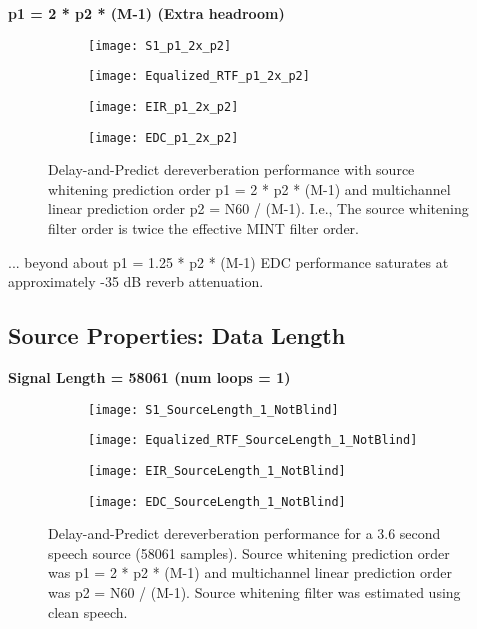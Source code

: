 \textbf{p1 = 2 * p2  * (M-1) (Extra headroom)}

\begin{figure}[H]
	\centering
	\begin{subfigure}[b]{0.49\textwidth}
		\centering
		\texttt{[image: S1\_p1\_2x\_p2]}
	\end{subfigure}
	\hfill
	\begin{subfigure}[b]{0.49\textwidth}
		\centering
		\texttt{[image: Equalized\_RTF\_p1\_2x\_p2]}
	\end{subfigure}
	\hfill
	\begin{subfigure}[b]{0.49\textwidth}
		\centering
		\texttt{[image: EIR\_p1\_2x\_p2]}
	\end{subfigure}
	\hfill
	\begin{subfigure}[b]{0.49\textwidth}
		\centering
		\texttt{[image: EDC\_p1\_2x\_p2]}
	\end{subfigure}
	\hfill
	\caption{Delay-and-Predict dereverberation performance with source whitening prediction order p1 = 2 * p2 * (M-1) and multichannel linear prediction order p2 = N60 / (M-1). I.e., The source whitening filter order is twice the effective MINT filter order.}
	\label{fig:params_p1_2x_p2}
\end{figure}

... beyond about p1 = 1.25 * p2 * (M-1) EDC performance saturates at approximately -35 dB reverb attenuation.

\subsection{Source Properties: Data Length}

\textbf{Signal Length = 58061 (num loops = 1)}

\begin{figure}[H]
	\centering
	\begin{subfigure}[b]{0.49\textwidth}
		\centering
		\texttt{[image: S1\_SourceLength\_1\_NotBlind]}
	\end{subfigure}
	\hfill
	\begin{subfigure}[b]{0.49\textwidth}
		\centering
		\texttt{[image: Equalized\_RTF\_SourceLength\_1\_NotBlind]}
	\end{subfigure}
	\hfill
	\begin{subfigure}[b]{0.49\textwidth}
		\centering
		\texttt{[image: EIR\_SourceLength\_1\_NotBlind]}
	\end{subfigure}
	\hfill
	\begin{subfigure}[b]{0.49\textwidth}
		\centering
		\texttt{[image: EDC\_SourceLength\_1\_NotBlind]}
	\end{subfigure}
	\hfill
	\caption{Delay-and-Predict dereverberation performance for a 3.6 second speech source (58061 samples). Source whitening prediction order was p1 = 2 * p2 * (M-1) and multichannel linear prediction order was p2 = N60 / (M-1). Source whitening filter was estimated using clean speech.}
	\label{fig:params_source_length_1_not_blind}
\end{figure}


